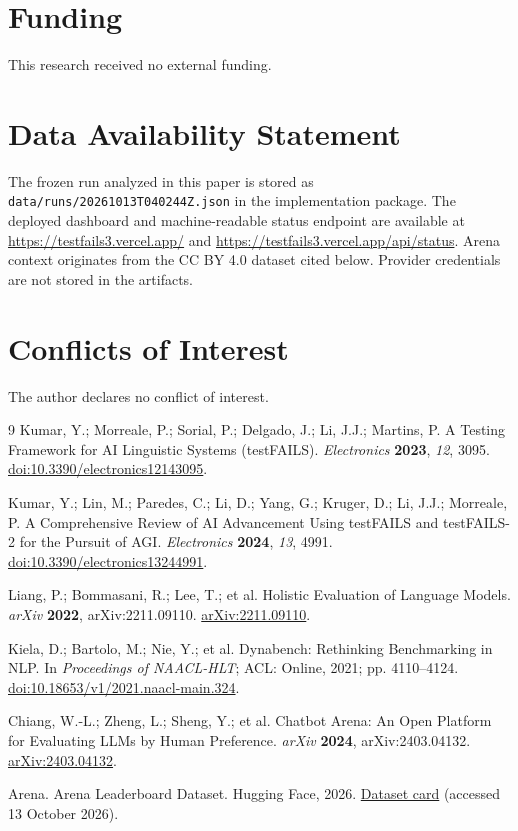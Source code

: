 \documentclass[10pt,twocolumn]{article}
\begin{document}
\section*{Funding}
This research received no external funding.

\section*{Data Availability Statement}
The frozen run analyzed in this paper is stored as \texttt{data/runs/20261013T040244Z.json} in the implementation package. The deployed dashboard and machine-readable status endpoint are available at \url{https://testfails3.vercel.app/} and \url{https://testfails3.vercel.app/api/status}. Arena context originates from the CC BY 4.0 dataset cited below. Provider credentials are not stored in the artifacts.

\section*{Conflicts of Interest}
The author declares no conflict of interest.

\begin{thebibliography}{9}
Kumar, Y.; Morreale, P.; Sorial, P.; Delgado, J.; Li, J.J.; Martins, P. A Testing Framework for AI Linguistic Systems (testFAILS). \textit{Electronics} \textbf{2023}, \textit{12}, 3095. \href{https://doi.org/10.3390/electronics12143095}{doi:10.3390/electronics12143095}.

Kumar, Y.; Lin, M.; Paredes, C.; Li, D.; Yang, G.; Kruger, D.; Li, J.J.; Morreale, P. A Comprehensive Review of AI Advancement Using testFAILS and testFAILS-2 for the Pursuit of AGI. \textit{Electronics} \textbf{2024}, \textit{13}, 4991. \href{https://doi.org/10.3390/electronics13244991}{doi:10.3390/electronics13244991}.

Liang, P.; Bommasani, R.; Lee, T.; et al. Holistic Evaluation of Language Models. \textit{arXiv} \textbf{2022}, arXiv:2211.09110. \href{https://arxiv.org/abs/2211.09110}{arXiv:2211.09110}.

Kiela, D.; Bartolo, M.; Nie, Y.; et al. Dynabench: Rethinking Benchmarking in NLP. In \textit{Proceedings of NAACL-HLT}; ACL: Online, 2021; pp. 4110--4124. \href{https://doi.org/10.18653/v1/2021.naacl-main.324}{doi:10.18653/v1/2021.naacl-main.324}.

Chiang, W.-L.; Zheng, L.; Sheng, Y.; et al. Chatbot Arena: An Open Platform for Evaluating LLMs by Human Preference. \textit{arXiv} \textbf{2024}, arXiv:2403.04132. \href{https://arxiv.org/abs/2403.04132}{arXiv:2403.04132}.

Arena. Arena Leaderboard Dataset. Hugging Face, 2026. \href{https://huggingface.co/datasets/lmarena-ai/leaderboard-dataset}{Dataset card} (accessed 13 October 2026).
\end{thebibliography}
\end{document}
